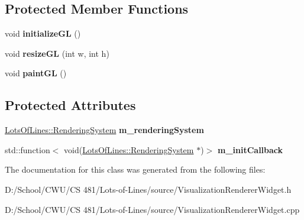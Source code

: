 \subsection*{Protected Member Functions}
\begin{DoxyCompactItemize}
\item 
void {\bfseries initialize\+GL} ()\hypertarget{class_visualization_renderer_widget_a7c939c4bc260f17ca27f75cf8df19d2c}{}\label{class_visualization_renderer_widget_a7c939c4bc260f17ca27f75cf8df19d2c}

\item 
void {\bfseries resize\+GL} (int w, int h)\hypertarget{class_visualization_renderer_widget_a9302869ffc3ef25e22b364c3a53e5f9a}{}\label{class_visualization_renderer_widget_a9302869ffc3ef25e22b364c3a53e5f9a}

\item 
void {\bfseries paint\+GL} ()\hypertarget{class_visualization_renderer_widget_af87bb821a2d686d463da4b8761e327cd}{}\label{class_visualization_renderer_widget_af87bb821a2d686d463da4b8761e327cd}

\end{DoxyCompactItemize}
\subsection*{Protected Attributes}
\begin{DoxyCompactItemize}
\item 
\hyperlink{class_lots_of_lines_1_1_rendering_system}{Lots\+Of\+Lines\+::\+Rendering\+System} {\bfseries m\+\_\+rendering\+System}\hypertarget{class_visualization_renderer_widget_a16400c459c25a2d3d0065a7e21833aa8}{}\label{class_visualization_renderer_widget_a16400c459c25a2d3d0065a7e21833aa8}

\item 
std\+::function$<$ void(\hyperlink{class_lots_of_lines_1_1_rendering_system}{Lots\+Of\+Lines\+::\+Rendering\+System} $\ast$)$>$ {\bfseries m\+\_\+init\+Callback}\hypertarget{class_visualization_renderer_widget_a54b6bdf2a28b74d25fc1adbf49870d1a}{}\label{class_visualization_renderer_widget_a54b6bdf2a28b74d25fc1adbf49870d1a}

\end{DoxyCompactItemize}


The documentation for this class was generated from the following files\+:\begin{DoxyCompactItemize}
\item 
D\+:/\+School/\+C\+W\+U/\+C\+S 481/\+Lots-\/of-\/\+Lines/source/Visualization\+Renderer\+Widget.\+h\item 
D\+:/\+School/\+C\+W\+U/\+C\+S 481/\+Lots-\/of-\/\+Lines/source/Visualization\+Renderer\+Widget.\+cpp\end{DoxyCompactItemize}
